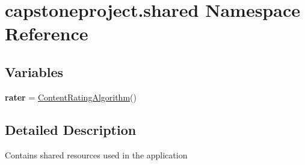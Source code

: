 \hypertarget{namespacecapstoneproject_1_1shared}{}\section{capstoneproject.\+shared Namespace Reference}
\label{namespacecapstoneproject_1_1shared}
\subsection*{Variables}
\begin{DoxyCompactItemize}
\item 
\mbox{\label{namespacecapstoneproject_1_1shared_aad1471392e36972e6d55343ba6c5f6b0}} 
{\bfseries rater} = \mbox{\hyperlink{classcapstoneproject_1_1content__rating_1_1algorithm_1_1content__rating_1_1_content_rating_algorithm}{Content\+Rating\+Algorithm}}()
\end{DoxyCompactItemize}


\subsection{Detailed Description}
\begin{DoxyVerb}Contains shared resources used in the application
\end{DoxyVerb}
 